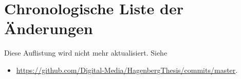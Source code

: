 \chapter{Chronologische Liste der Änderungen}


Diese Auflistung wird nicht mehr aktualisiert. Siehe
\begin{itemize}
\item[] \url{https://github.com/Digital-Media/HagenbergThesis/commits/master}.
\end{itemize}
